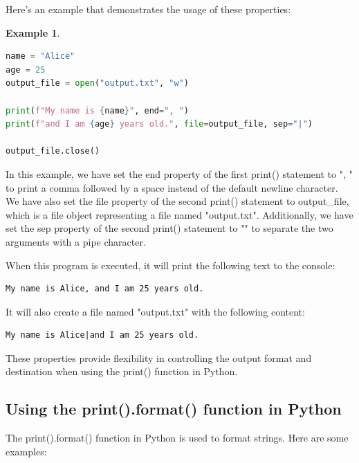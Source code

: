 \documentclass[12pt]{article}
\newtheorem{Example}{Example}[section]
\begin{document}
Here's an example that demonstrates the usage of these properties:

\begin{Example}
\begin{lstlisting}[language=Python]
name = "Alice"
age = 25
output_file = open("output.txt", "w")

print(f"My name is {name}", end=", ")
print(f"and I am {age} years old.", file=output_file, sep="|")

output_file.close()
\end{lstlisting}
\end{Example}

In this example, we have set the end property of the first print() statement to ", " to print a comma followed by a space instead of the default newline character. We have also set the file property of the second print() statement to output\_file, which is a file object representing a file named "output.txt". Additionally, we have set the sep property of the second print() statement to "\textbar{}" to separate the two arguments with a pipe character.

When this program is executed, it will print the following text to the console:

\begin{verbatim}
My name is Alice, and I am 25 years old.
\end{verbatim}

It will also create a file named "output.txt" with the following content:

\begin{verbatim}
My name is Alice|and I am 25 years old.
\end{verbatim}

These properties provide flexibility in controlling the output format and destination when using the print() function in Python.

\subsection{Using the print().format() function in Python}

The print().format() function in Python is used to format strings. Here are some examples:
\end{document}
